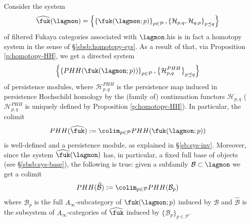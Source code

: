 Consider the system $$\widehat{\fuk}(\lagmon)= \left\{\left\{\fuk(\lagmon;p)\right\}_{p\in \mathcal{P}}, \left\{\mathcal{H}_{p,q},\mathcal{H}_{q,p}\right\}_{p\preceq q}\right\}$$ of filtered Fukaya categories associated with $\lagmon$.his is in fact a homotopy system in the sense of \S\ref{sbsb:homotopy-sys}.
As a result of that, via Proposition \ref{p:homotopy-HH}, we get a directed system $$\left\{\left\{PHH(\fuk(\lagmon;p))\right\}_{p\in \mathcal{P}}, \left\{\mathcal{H}_{p,q}^{PHH}\right\}_{p\preceq q}\right\} $$ of persistence modules, where $\mathcal{H}_{p,q}^{PHH}$ is the persistence map induced in persistence Hochschild homology by the (family of) continuation functors $\mathcal{H}_{p,q}$ ($\mathcal{H}_{p,q}^{PHH}$ is uniquely defined by Proposition \ref{p:homotopy-HH}). In particular, the colimit $$PHH(\widehat{\fuk}):=\colim_{p\in \mathcal{{P}}}PHH(\fuk(\lagmon;p))$$ is well-defined and a persistence module, as explained in \S\ref{sb:sys-inv}. Moreover, since the system $\widehat{\fuk}(\lagmon)$ has, in particular, a fixed full base of objects (see \S\ref{sbsb:sys-base}), the following is true: given a subfamily $\mathcal{B}\subset \lagmon$ we get a colimit $$PHH(\widehat{\mathcal{B}}):=\colim_{p\in \mathcal{P}}PHH(\mathcal{B}_p)$$ where $\mathcal{B}_p$ is the full $A_\infty$-subcategory of $\fuk(\lagmon;p)$ induced by $\mathcal{B}$ and $\widehat{\mathcal{B}}$ is the subsystem of $A_\infty$-categories of $\widehat{\fuk}$ induced by $\{\mathcal{B}_p\}_{p\in \mathcal{P}}$.\\

